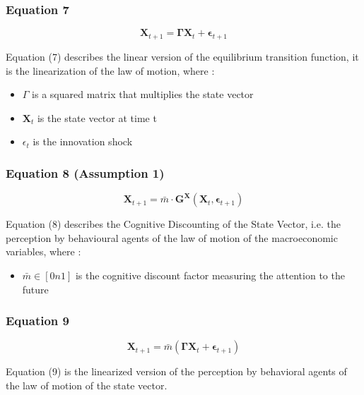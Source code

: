\documentclass{article}
\begin{document}
\subsubsection*{Equation 7}

\begin{equation}\tag{7}
    \bm{X}_{t+1}=\bm{\Gamma}\bm{X}_{t}+\bm{\epsilon}_{t+1}
\end{equation}

Equation (7) describes the linear version of the equilibrium transition function, it is the linearization of the law of motion, where :
\begin{itemize}
    \item $\Gamma$ is a squared matrix that multiplies the state vector
    \item $\bm{X}_t$ is the state vector at time t
    \item $\epsilon_{t}$ is the innovation shock
\end{itemize}

\subsubsection*{Equation 8 (Assumption 1)}

\begin{equation}\tag{8}
    \bm{X}_{t+1}=\bar{m}\cdot\bm{G}^{\bm{X}}(\bm{X}_{t},\bm{\epsilon}_{t+1})
\end{equation}

Equation (8) describes the Cognitive Discounting of the State Vector, i.e. the perception by behavioural agents of the law of motion of the macroeconomic variables, where : 
\begin{itemize}
    \item $\bar{m}\in\left[0n1\right]$ is the cognitive discount factor measuring the attention to the future
\end{itemize}

\subsubsection*{Equation 9}

\begin{equation}\tag{9}
    \bm{X}_{t+1}=\bar{m}(\bm{\Gamma}\bm{X}_{t}+\bm{\epsilon}_{t+1})
\end{equation}

Equation (9) is the linearized version of the perception by behavioral agents of the law of motion of the state vector. 
\end{document}
